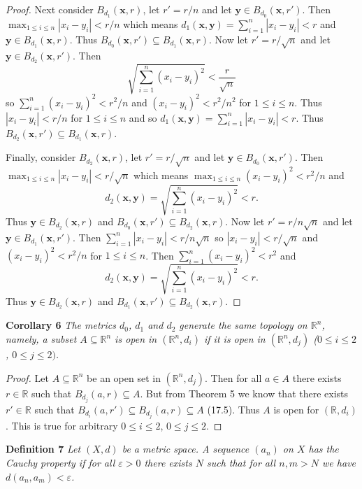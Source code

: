 \documentclass{article}
\begin{document}
\begin{flushleft}
\begin{proof}
Next consider $B_{d_1}(\mathbf x, r)$, let $r' = r/n$ and let $\mathbf y \in B_{d_0}(\mathbf x, r')$. Then $\max_{1 \leq i \leq n} |x_i - y_i| < r/n$ which means $d_1(\mathbf x, \mathbf y) = \sum_{i=1}^n |x_i - y_i| < r$ and $\mathbf{y} \in B_{d_1}(\mathbf x, r)$. Thus $B_{d_0}(\mathbf x, r') \subseteq B_{d_1}(\mathbf x, r)$. Now let $r' = r/\sqrt{n}$ and let $\mathbf y \in B_{d_2}(\mathbf x, r')$. Then
\[
\sqrt{\sum_{i=1}^n (x_i - y_i)^2} < \frac{r}{\sqrt{n}}
\]
so $\sum_{i=1}^n (x_i - y_i)^2 < r^2/n$ and $(x_i - y_i)^2 < r^2/n^2$ for $1 \leq i \leq n$. Thus $|x_i - y_i| < r/n$ for $1 \leq i \leq n$ and so $d_1(\mathbf x, \mathbf y) = \sum_{i=1}^n |x_i - y_i| < r$. Thus $B_{d_2}(\mathbf x, r') \subseteq B_{d_1}(\mathbf x, r)$.\newline

Finally, consider $B_{d_2}(\mathbf x, r)$, let $r' = r/\sqrt{n}$ and let $\mathbf y \in B_{d_0}(\mathbf x, r')$. Then $\max_{1 \leq i \leq n} |x_i - y_i| < r/\sqrt{n}$ which means $\max_{1 \leq i \leq n} (x_i - y_i)^2 < r^2/n$ and
\[
d_2(\mathbf x, \mathbf y) = \sqrt{\sum_{i=1}^n (x_i-y_i)^2} < r.
\]
Thus $\mathbf y \in B_{d_2}(\mathbf x, r)$ and $B_{d_0}(\mathbf x, r') \subseteq B_{d_2}(\mathbf x, r)$. Now let $r' = r/n\sqrt{n}$ and let $\mathbf y \in B_{d_1}(\mathbf x, r')$. Then $\sum_{i=1}^n |x_i - y_i| < r/n\sqrt{n}$ so $|x_i - y_i| < r/\sqrt{n}$ and $(x_i - y_i)^2 < r^2/n$ for $1 \leq i \leq n$. Then $\sum_{i=1}^n (x_i - y_i)^2 < r^2$ and
\[
d_2(\mathbf x, \mathbf y) = \sqrt{\sum_{i=1}^n (x_i-y_i)^2} < r.
\]
Thus $\mathbf y \in B_{d_2}(\mathbf x, r)$ and $B_{d_1} (\mathbf x, r') \subseteq B_{d_2}(\mathbf x, r)$.
\end{proof}

\textbf{Corollary 6}
\textsl{The metrics $d_0$, $d_1$ and $d_2$ generate the same topology on $\mathbb{R}^n$, namely, a subset $A \subseteq \mathbb{R}^n$ is open in $(\mathbb{R}^n, d_i)$ if it is open in $(\mathbb{R}^n, d_j)$ ($0 \leq i \leq 2$, $0 \leq j \leq 2)$.}
\begin{proof}
Let $A \subseteq \mathbb{R}^n$ be an open set in $(\mathbb{R}^n, d_j)$. Then for all $a \in A$ there exists $r \in \mathbb{R}$ such that $B_{d_j}(a,r) \subseteq A$. But from Theorem 5 we know that there exists $r' \in \mathbb{R}$ such that $B_{d_i}(a,r') \subseteq B_{d_j}(a,r) \subseteq A$ (17.5). Thus $A$ is open for $(\mathbb{R}, d_i)$. This is true for arbitrary $0 \leq i \leq 2$, $0 \leq j \leq 2$.
\end{proof}

\textbf{Definition 7}
\textsl{Let $(X,d)$ be a metric space. A sequence $(a_n)$ on $X$ has the Cauchy property if for all $\varepsilon > 0$ there exists $N$ such that for all $n,m > N$ we have $d(a_n,a_m) < \varepsilon$.}\newline


\end{flushleft}
\end{document}

